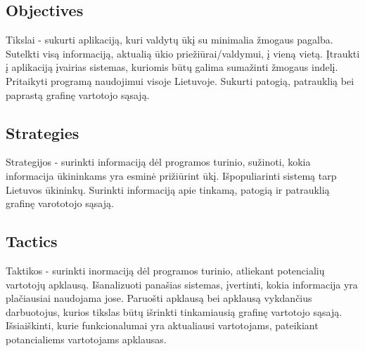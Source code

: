 \documentclass[oneside]{VUMIFPSkursinis}
\begin{document}
\subsection{Objectives}
Tikslai - sukurti aplikaciją, kuri valdytų ūkį su minimalia žmogaus pagalba.
Sutelkti visą informaciją, aktualią ūkio priežiūrai/valdymui, į vieną vietą.
Įtraukti į aplikaciją įvairias sistemas, kuriomis būtų galima sumažinti žmogaus indelį.
Pritaikyti programą naudojimui visoje Lietuvoje.
Sukurti patogią, patrauklią bei paprastą grafinę vartotojo sąsają.
\subsection{Strategies}
Strategijos - surinkti informaciją dėl programos turinio, sužinoti, kokia informacija ūkininkams yra esminė prižiūrint ūkį.
Išpopuliarinti sistemą tarp Lietuvos ūkininkų.
Surinkti informaciją apie tinkamą, patogią ir patrauklią grafinę varototojo sąsają.
\subsection{Tactics}
Taktikos - surinkti inormaciją dėl programos turinio, atliekant potencialių vartotojų apklausą.
Išanalizuoti panašias sistemas, įvertinti, kokia informacija yra plačiausiai naudojama jose.
Paruošti apklausą bei apklausą vykdančius darbuotojus, kurios tikslas būtų išrinkti tinkamiausią grafinę vartotojo sąsają.
Išsiaiškinti, kurie funkcionalumai yra aktualiausi vartotojams, pateikiant potancialiems vartotojams apklausas.
\end{document}

